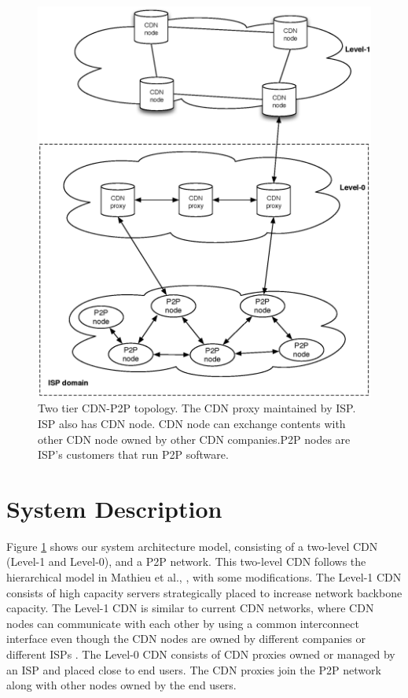 \documentclass[paper]{ieice}
\begin{document}
\begin{figure}[hb]
\begin{center}
\includegraphics[scale=0.4]{graphs/two-tier-cdn-topology.eps}
\end{center}
\caption{Two tier CDN-P2P topology.
The CDN proxy maintained by ISP. ISP also has CDN node. CDN node can exchange contents with other CDN node owned by other CDN companies.P2P nodes are ISP's customers that run P2P software.}
\label{fig:twotier}
\vspace{-2mm}
\end{figure} 


 
\section{System Description}\label{description}

Figure \ref{fig:twotier} shows our system architecture model, consisting of a two-level CDN (Level-1 and Level-0), and a P2P network.
This two-level CDN follows the hierarchical model in  Mathieu et al., \cite{6249305}, with some modifications.
The Level-1 CDN consists of high capacity servers strategically placed to increase network backbone capacity.
The Level-1 CDN is similar to current CDN networks, where CDN nodes can communicate with each other by using a common interconnect interface even though the CDN nodes are owned by different companies or different ISPs \cite{cdni}.
The Level-0 CDN consists of CDN proxies owned or managed by an ISP and placed close to end users.
The CDN proxies join the P2P network along with other nodes owned by the end users.
\end{document}
